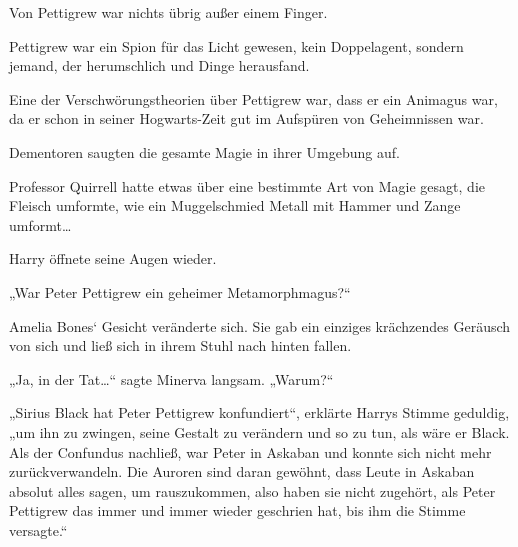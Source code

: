 Von Pettigrew war nichts übrig außer einem Finger.

Pettigrew war ein Spion für das Licht gewesen, kein Doppelagent, sondern jemand, der herumschlich und Dinge herausfand.

Eine der Verschwörungstheorien über Pettigrew war, dass er ein Animagus war, da er schon in seiner Hogwarts-Zeit gut im Aufspüren von Geheimnissen war.

Dementoren saugten die gesamte Magie in ihrer Umgebung auf.

Professor Quirrell hatte etwas über eine bestimmte Art von Magie gesagt, die Fleisch umformte, wie ein Muggelschmied Metall mit Hammer und Zange umformt…

Harry öffnete seine Augen wieder.

„War Peter Pettigrew ein geheimer Metamorphmagus?“

Amelia Bones‘ Gesicht veränderte sich. Sie gab ein einziges krächzendes Geräusch von sich und ließ sich in ihrem Stuhl nach hinten fallen.

„Ja, in der Tat…“ sagte Minerva langsam. „Warum?“

„Sirius Black hat Peter Pettigrew konfundiert“, erklärte Harrys Stimme geduldig,
„um ihn zu zwingen, seine Gestalt zu verändern und so zu tun, als wäre er Black. Als der Confundus nachließ, war Peter in Askaban und konnte sich nicht mehr zurückverwandeln. Die Auroren sind daran gewöhnt, dass Leute in Askaban absolut alles sagen, um rauszukommen, also haben sie nicht zugehört, als Peter Pettigrew das immer und immer wieder geschrien hat, bis ihm die Stimme versagte.“

